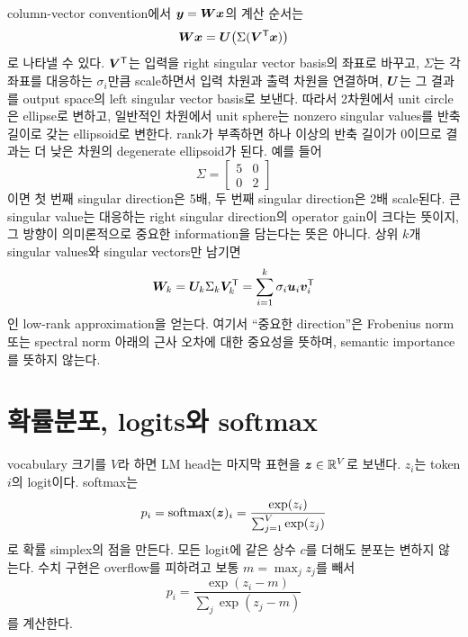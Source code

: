 column-vector convention에서 $\bm{y}=\bm{W}\bm{x}$의 계산 순서는
\begin{equation}
  \bm{W}\bm{x}
  =\bm{U}\bigl(\Sigma(\bm{V}^{\mathsf T}\bm{x})\bigr)
\end{equation}
로 나타낼 수 있다.
$\bm{V}^{\mathsf T}$는 입력을 right singular vector basis의 좌표로 바꾸고, $\Sigma$는 각 좌표를 대응하는 $\sigma_i$만큼 scale하면서 입력 차원과 출력 차원을 연결하며, $\bm{U}$는 그 결과를 output space의 left singular vector basis로 보낸다.
따라서 2차원에서 unit circle은 ellipse로 변하고, 일반적인 차원에서 unit sphere는 nonzero singular values를 반축 길이로 갖는 ellipsoid로 변한다.
rank가 부족하면 하나 이상의 반축 길이가 0이므로 결과는 더 낮은 차원의 degenerate ellipsoid가 된다.
예를 들어
\begin{equation}
  \Sigma=
  \begin{bmatrix}
    5 & 0 \\
    0 & 2
  \end{bmatrix}
\end{equation}
이면 첫 번째 singular direction은 5배, 두 번째 singular direction은 2배 scale된다.
큰 singular value는 대응하는 right singular direction의 operator gain이 크다는 뜻이지, 그 방향이 의미론적으로 중요한 information을 담는다는 뜻은 아니다.
상위 $k$개 singular values와 singular vectors만 남기면
\begin{equation}
  \bm{W}_k
  =\bm{U}_k\Sigma_k\bm{V}_k^{\mathsf T}
  =\sum_{i=1}^{k}\sigma_i\bm{u}_i\bm{v}_i^{\mathsf T}
\end{equation}
인 low-rank approximation을 얻는다.
여기서 ``중요한 direction''은 Frobenius norm 또는 spectral norm 아래의 근사 오차에 대한 중요성을 뜻하며, semantic importance를 뜻하지 않는다.

\section{확률분포, logits와 softmax}

vocabulary 크기를 $V$라 하면 LM head는 마지막 표현을 $\bm{z}\in\mathbb{R}^V$로 보낸다.
$z_i$는 token $i$의 logit이다.
softmax는
\begin{equation}
  p_i=\operatorname{softmax}(\bm{z})_i
  =\frac{\exp(z_i)}{\sum_{j=1}^{V}\exp(z_j)}
\end{equation}
로 확률 simplex의 점을 만든다.
모든 logit에 같은 상수 $c$를 더해도 분포는 변하지 않는다.
수치 구현은 overflow를 피하려고 보통 $m=\max_j z_j$를 빼서
\begin{equation}
  p_i=\frac{\exp(z_i-m)}{\sum_j\exp(z_j-m)}
\end{equation}
를 계산한다.

